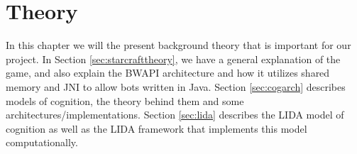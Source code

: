 
\chapter{Theory}
In this chapter we will the present background theory that is important for our project. In Section \ref{sec:starcrafttheory}, we have a general explanation of the game, and also explain the BWAPI architecture and how it utilizes shared memory and JNI to allow bots written in Java. Section \ref{sec:cogarch} describes models of cognition, the theory behind them and some architectures/implementations. Section \ref{sec:lida} describes the LIDA model of cognition as well as the LIDA framework that implements this model computationally.




